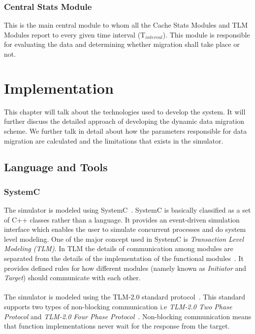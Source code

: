 \documentclass{listhesis}
\begin{document}
\subsection{Central Stats Module}
This is the main central module to whom all the Cache Stats Modules and TLM Modules report to every given time interval (T$_{interval}$). This module is responsible for evaluating the data and determining whether migration shall take place or not.
\chapter{Implementation}
This chapter will talk about the technologies used to develop the system. It will further discuss the detailed approach of developing the dynamic data migration scheme. We further talk in detail about how the parameters responsible for data migration are calculated and the limitations that exists in the simulator. \\
\section{Language and Tools}
\subsection{SystemC}
The simulator is modeled using SystemC~\cite{systemc}. SystemC is basically classified as a set of C++ classes rather than a language. It provides an event-driven simulation interface which enables the user to simulate concurrent processes and do system level modeling. One of the major concept used in SystemC is \textit{Transaction Level Modeling (TLM)}. In TLM the details of communication among modules are separated from the details of the implementation of the functional modules~\cite{tlm}. It provides defined rules for how different modules (namely known as \textit{Initiator} and \textit{Target}) should communicate with each other. \\
\\
The simulator is modeled using the TLM-2.0 standard protocol~\cite{systemc}. This standard supports two types of non-blocking communication i.e \textit{TLM-2.0 Two Phase Protocol} and \textit{TLM-2.0 Four Phase Protocol}~\cite{akshay}. Non-blocking communication means that function implementations never wait for the response from the target.
\end{document}
